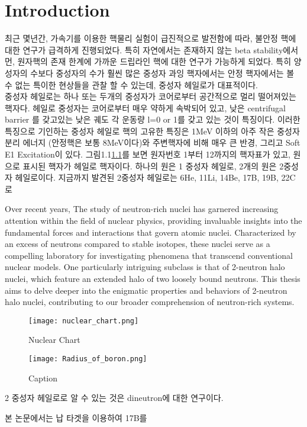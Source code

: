 \chapter{Introduction}
최근 몇년간, 가속기를 이용한 핵물리 실험이 급진적으로 발전함에 따라, 불안정 핵에 대한 연구가 급격하게 진행되었다. 특히 자연에서는 존재하지 않는 beta stability에서 먼, 원자핵의 존재 한계에 가까운 드립라인 핵에 대한 연구가 가능하게 되었다. 특히 양성자의 수보다 중성자의 수가 훨씬 많은 중성자 과잉 핵자에서는 안정 핵자에서는 볼 수 없는 특이한 현상들을 관찰 할 수 있는데, 중성자 헤일로가 대표적이다. \\
\indent 중성자 헤일로는 하나 또는 두개의 중성자가 코어로부터 공간적으로 멀리 떨어져있는 핵자다.\cite{tanihata} 헤일로 중성자는 코어로부터 매우 약하게 속박되어 있고, 낮은 centrifugal barrier 를 갖고있는 낮은 궤도 각 운동량 l=0 or 1를 갖고 있는 것이 특징이다. 이러한 특징으로 기인하는 중성자 헤일로 핵의 고유한 특징은 1MeV 이하의 아주 작은 중성자 분리 에너지 (안정핵은 보통 8MeV이다)와 주변핵자에 비해 매우 큰 반경, 그리고 Soft E1 Excitation이 있다.
그림1.1\ref{Nuclear chart}를 보면 원자번호 1부터 12까지의 핵자표가 있고, 원으로 표시된 핵자가 헤일로 핵자이다. 하나의 원은 1 중성자 헤일로, 2개의 원은 2중성자 헤일로이다. 지금까지 발견된 2중성자 헤일로는 6He, 11Li, 14Be, 17B, 19B, 22C로 

Over recent years, The study of neutron-rich nuclei has garnered increasing attention within the field of nuclear physics, providing invaluable insights into the fundamental forces and interactions that govern atomic nuclei. Characterized by an excess of neutrons compared to stable isotopes, these nuclei serve as a compelling laboratory for investigating phenomena that transcend conventional nuclear models. One particularly intriguing subclass is that of 2-neutron halo nuclei, which feature an extended halo of two loosely bound neutrons.\cite{tanihata} This thesis aims to delve deeper into the enigmatic properties and behaviors of 2-neutron halo nuclei, contributing to our broader comprehension of neutron-rich systems.

\begin{figure}[h]
    \centering
    \texttt{[image: nuclear\_chart.png]}
    \caption{Nuclear Chart}
    \label{Nuclear chart}
\end{figure}

\begin{figure}
    \centering
    \texttt{[image: Radius\_of\_boron.png]}
    \caption{Caption}
    \label{fig:enter-label}
\end{figure}
2 중성자 헤일로로 알 수 있는 것은 dineutron에 대한 연구이다. 

본 논문에서는 납 타겟을 이용하여 17B를 




